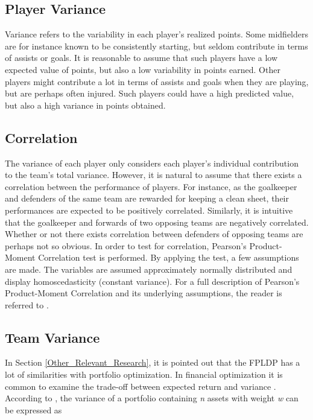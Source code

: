 \subsection{Player Variance}
Variance refers to the variability in each player's realized points. Some midfielders are for instance known to be consistently starting, but seldom contribute in terms of assists or goals. It is reasonable to assume that such players have a low expected value of points, but also a low variability in points earned. Other players might contribute a lot in terms of assists and goals when they are playing, but are perhaps often injured. Such players could have a high predicted value, but also a high variance in points obtained. \newpar

\subsection{Correlation}
The variance of each player only considers each player's individual contribution to the team's total variance. However, it is natural to assume that there exists a correlation between the performance of players. For instance, as the goalkeeper and defenders of the same team are rewarded for keeping a clean sheet, their performances are expected to be positively correlated. Similarly, it is intuitive that the goalkeeper and forwards of two opposing teams are negatively correlated. Whether or not there exists correlation between defenders of opposing teams are perhaps not so obvious. In order to test for correlation, Pearson's Product-Moment Correlation test is performed. By applying the test, a few assumptions are made. The variables are assumed approximately normally distributed and display homoscedasticity (constant variance). For a full description of Pearson's Product-Moment Correlation and its underlying assumptions, the reader is referred to \cite{laerd}.  \newpar

\subsection{Team Variance}

In Section \ref{Other_Relevant_Research}, it is pointed out that the FPLDP has a lot of similarities with portfolio optimization. In financial optimization it is common to examine the trade-off between expected return and variance \citep{Markowitz}. According to \cite{Zenios}, the variance of a portfolio containing \textit{n} assets with weight \textit{w} can be expressed as 

